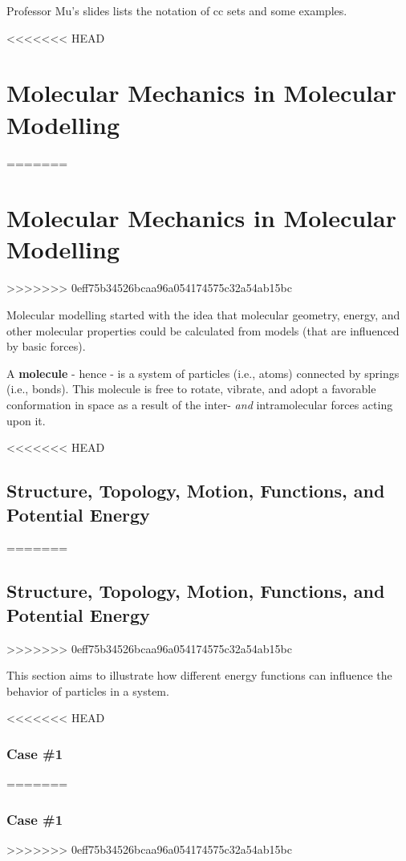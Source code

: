 \documentclass[
  letterpaper,
  DIV=11,
  numbers=noendperiod]{scrreprt}
\begin{document}
Professor Mu's slides lists the notation of cc sets and some examples.

<<<<<<< HEAD
\hypertarget{molecular-mechanics-in-molecular-modelling-1}{%
\chapter{Molecular Mechanics in Molecular
Modelling}\label{molecular-mechanics-in-molecular-modelling-1}}
=======
\hypertarget{molecular-mechanics-in-molecular-modelling}{%
\chapter{Molecular Mechanics in Molecular
Modelling}\label{molecular-mechanics-in-molecular-modelling}}
>>>>>>> 0eff75b34526bcaa96a054174575c32a54ab15bc

Molecular modelling started with the idea that molecular geometry,
energy, and other molecular properties could be calculated from models
(that are influenced by basic forces).

A \textbf{molecule} - hence - is a system of particles (i.e., atoms)
connected by springs (i.e., bonds). This molecule is free to rotate,
vibrate, and adopt a favorable conformation in space as a result of the
inter- \emph{and} intramolecular forces acting upon it.

<<<<<<< HEAD
\hypertarget{structure-topology-motion-functions-and-potential-energy-1}{%
\section{Structure, Topology, Motion, Functions, and Potential
Energy}\label{structure-topology-motion-functions-and-potential-energy-1}}
=======
\hypertarget{structure-topology-motion-functions-and-potential-energy}{%
\section{Structure, Topology, Motion, Functions, and Potential
Energy}\label{structure-topology-motion-functions-and-potential-energy}}
>>>>>>> 0eff75b34526bcaa96a054174575c32a54ab15bc

This section aims to illustrate how different energy functions can
influence the behavior of particles in a system.

<<<<<<< HEAD
\hypertarget{case-1-1}{%
\subsection{Case \#1}\label{case-1-1}}
=======
\hypertarget{case-1}{%
\subsection{Case \#1}\label{case-1}}
>>>>>>> 0eff75b34526bcaa96a054174575c32a54ab15bc
\end{document}
